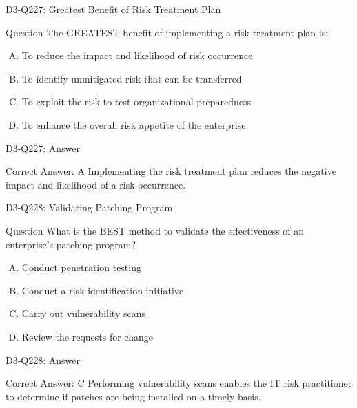 \documentclass{beamer}
\begin{document}
	\begin{frame}{D3-Q227: Greatest Benefit of Risk Treatment Plan}
		\begin{block}{Question}
			The GREATEST benefit of implementing a risk treatment plan is:
		\end{block}
		\begin{enumerate}[(A)]
			\item To reduce the impact and likelihood of risk occurrence
			\item To identify unmitigated risk that can be transferred
			\item To exploit the risk to test organizational preparedness
			\item To enhance the overall risk appetite of the enterprise
		\end{enumerate}
	\end{frame}
	\begin{frame}{D3-Q227: Answer}
		\begin{block}{Correct Answer: A}
			Implementing the risk treatment plan reduces the negative impact and likelihood of a risk occurrence.
		\end{block}
	\end{frame}
	
	\begin{frame}{D3-Q228: Validating Patching Program}
		\begin{block}{Question}
			What is the BEST method to validate the effectiveness of an enterprise's patching program?
		\end{block}
		\begin{enumerate}[(A)]
			\item Conduct penetration testing
			\item Conduct a risk identification initiative
			\item Carry out vulnerability scans
			\item Review the requests for change
		\end{enumerate}
	\end{frame}
	\begin{frame}{D3-Q228: Answer}
		\begin{block}{Correct Answer: C}
			Performing vulnerability scans enables the IT risk practitioner to determine if patches are being installed on a timely basis.
		\end{block}
	\end{frame}
	
\end{document}
